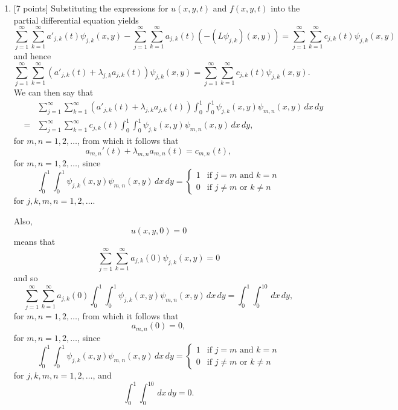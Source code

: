 \begin{solution}
\begin{enumerate}
\item {[7 points]} Substituting the expressions for $u(x,y,t)$ and $f(x,y,t)$ into the partial differential equation yields
\[
\sum_{j=1}^\infty \sum_{k=1}^\infty a'_{j,k}(t) \psi_{j,k} (x,y)-\sum_{j=1}^\infty \sum_{k=1}^\infty a_{j,k}(t) \left(-\left(L\psi_{j,k}\right) (x,y)\right)=\sum_{j=1}^\infty \sum_{k=1}^\infty c_{j,k}(t) \psi_{j,k} (x,y)
\]
and hence
\[
\sum_{j=1}^\infty \sum_{k=1}^\infty \left(a'_{j,k}(t)+\lambda_{j,k}a_{j,k}(t)\right)\psi_{j,k} (x,y)=\sum_{j=1}^\infty \sum_{k=1}^\infty c_{j,k}(t) \psi_{j,k} (x,y).
\]
We can then say that
\begin{eqnarray*}
&&\sum_{j=1}^\infty \sum_{k=1}^\infty \left(a'_{j,k}(t)+\lambda_{j,k}a_{j,k}(t)\right)\int_0^1\int_0^1\psi_{j,k} (x,y)\psi_{m,n} (x,y)\,dx\,dy
\\
&=&\sum_{j=1}^\infty \sum_{k=1}^\infty c_{j,k}(t) \int_0^1\int_0^1\psi_{j,k} (x,y)\psi_{m,n} (x,y)\,dx\,dy,
\end{eqnarray*}
for $m,n=1,2,\ldots$, from which it follows that
\[
a_{m,n}'(t)+\lambda_{m,n} a_{m,n}(t)=c_{m,n}(t),
\]
for $m,n=1,2,\ldots$, since
\[
\int_0^1\int_0^1\psi_{j,k} (x,y)\psi_{m,n} (x,y)\,dx\,dy = \left\{\begin{array}{ll} 1 & \mbox{if }j=m\mbox{ and }k=n \\ 0 & \mbox{if }j\ne m\mbox{ or }k\ne n \end{array}\right.
\]
for $j,k,m,n=1,2,\ldots$.

Also,
\[
u(x,y,0)=0
\]
means that
\[
\sum_{j=1}^\infty \sum_{k=1}^\infty a_{j,k}(0) \psi_{j,k} (x,y)=0
\]
and so
\[
\sum_{j=1}^\infty \sum_{k=1}^\infty a_{j,k}(0) \int_0^1\int_0^1\psi_{j,k} (x,y)\psi_{m,n} (x,y)\,dx\,dy=\int_0^1\int_0^10\,dx\,dy,
\]
for $m,n=1,2,\ldots$, from which it follows that
\[
a_{m,n}(0)=0,
\]
for $m,n=1,2,\ldots$, since
\[
\int_0^1\int_0^1\psi_{j,k} (x,y)\psi_{m,n} (x,y)\,dx\,dy = \left\{\begin{array}{ll} 1 & \mbox{if }j=m\mbox{ and }k=n \\ 0 & \mbox{if }j\ne m\mbox{ or }k\ne n \end{array}\right.
\]
for $j,k,m,n=1,2,\ldots$, and
\[
\int_0^1\int_0^10\,dx\,dy=0.
\]


\end{enumerate}
\end{solution}
